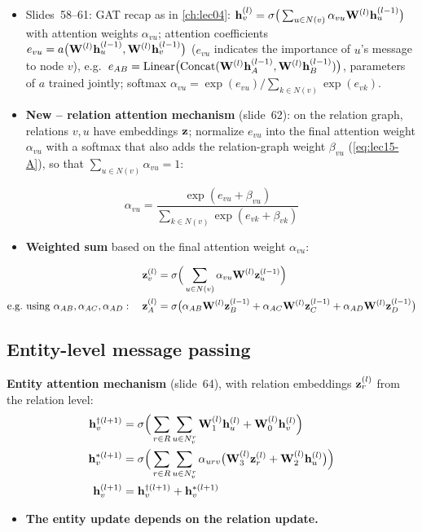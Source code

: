 \begin{itemize}
  \item Slides~58--61: GAT recap as in \cref{ch:lec04}:
    $\mathbf{h}_v^{(l)}=\sigma\big(\sum_{u\in N(v)}\alpha_{vu}\mathbf{W}^{(l)}\mathbf{h}_u^{(l-1)}\big)$ with
    attention weights $\alpha_{vu}$; attention coefficients
    $e_{vu}=a\big(\mathbf{W}^{(l)}\mathbf{h}_u^{(l-1)},\mathbf{W}^{(l)}\mathbf{h}_v^{(l-1)}\big)$ ($e_{vu}$ indicates
    the importance of $u$'s message to node $v$), e.g.\
    $e_{AB}=\mathrm{Linear}\big(\mathrm{Concat}(\mathbf{W}^{(l)}\mathbf{h}_A^{(l-1)},\mathbf{W}^{(l)}\mathbf{h}_B^{(l-1)})\big)$,
    parameters of $a$ trained jointly; softmax
    $\alpha_{vu}=\exp(e_{vu})/\sum_{k\in N(v)}\exp(e_{vk})$.
  \item \textbf{New -- relation attention mechanism} (slide~62): on the relation graph,
    relations $v,u$ have embeddings $\mathbf{z}$; normalize $e_{vu}$ into the final attention
    weight $\alpha_{vu}$ with a softmax that also adds the relation-graph weight
    $\beta_{vu}$ (\cref{eq:lec15-A}), so that $\sum_{u\in N(v)}\alpha_{vu}=1$:
\end{itemize}
\begin{equation}\label{eq:lec15-relatt}
  \alpha_{vu} = \frac{\exp(e_{vu}+\beta_{vu})}{\sum_{k\in N(v)}\exp(e_{vk}+\beta_{vk})}
\end{equation}
\begin{itemize}
  \item \textbf{Weighted sum} based on the final attention weight $\alpha_{vu}$:
\end{itemize}
\begin{align}
  \mathbf{z}_v^{(l)} &= \sigma\Big(\sum_{u\in N(v)}\alpha_{vu}\mathbf{W}^{(l)}\mathbf{z}_u^{(l-1)}\Big)
    \label{eq:lec15-relmp}\\
  \text{e.g.\ using } \alpha_{AB},\alpha_{AC},\alpha_{AD}:\quad
  \mathbf{z}_A^{(l)} &= \sigma\big(\alpha_{AB}\mathbf{W}^{(l)}\mathbf{z}_B^{(l-1)} + \alpha_{AC}\mathbf{W}^{(l)}\mathbf{z}_C^{(l-1)}
    + \alpha_{AD}\mathbf{W}^{(l)}\mathbf{z}_D^{(l-1)}\big) \notag
\end{align}

\subsection{Entity-level message passing}\label{sec:lec15-entmp}
\slides{63--64}

\textbf{Entity attention mechanism} (slide~64), with relation embeddings $\mathbf{z}_r^{(l)}$
from the relation level:
\begin{align}
  \mathbf{h}_v^{\dagger(l+1)} &= \sigma\Big(\sum_{r\in R}\sum_{u\in N_v^r}\mathbf{W}_1^{(l)}\mathbf{h}_u^{(l)}
    + \mathbf{W}_0^{(l)}\mathbf{h}_v^{(l)}\Big) \label{eq:lec15-ent1}\\
  \mathbf{h}_v^{\ast(l+1)} &= \sigma\Big(\sum_{r\in R}\sum_{u\in N_v^r}\alpha_{urv}
    \big(\mathbf{W}_3^{(l)}\mathbf{z}_r^{(l)} + \mathbf{W}_2^{(l)}\mathbf{h}_u^{(l)}\big)\Big) \label{eq:lec15-ent2}\\
  \mathbf{h}_v^{(l+1)} &= \mathbf{h}_v^{\dagger(l+1)} + \mathbf{h}_v^{\ast(l+1)} \label{eq:lec15-ent3}
\end{align}
\begin{itemize}
  \item \textbf{The entity update depends on the relation update.}
\end{itemize}

